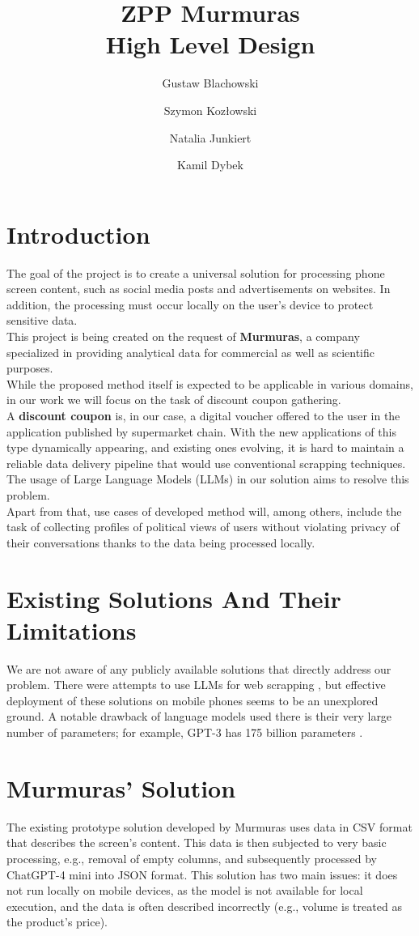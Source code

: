 \documentclass[12pt]{article}
\title{ZPP Murmuras\\ High Level Design}
\author{Gustaw Blachowski \and Szymon Kozłowski \and Natalia Junkiert \and Kamil Dybek}
\date{}
\begin{document}
\maketitle

\section*{Introduction}
The goal of the project is to create a universal solution for processing phone screen content, such as social media posts and advertisements on websites. In addition, the processing must occur locally on the user's device to protect sensitive data.\\
This project is being created on the request of \textbf{Murmuras}, a company specialized in providing analytical data for commercial as well as scientific purposes. \\
While the proposed method itself is expected to be applicable in various domains, in our work we will focus on the task of discount coupon gathering.\\
A \textbf{discount coupon} is, in our case, a digital voucher offered to the user in the application published by supermarket chain. With the new applications of this type dynamically appearing, and existing ones evolving, it is hard to maintain a reliable data delivery pipeline that would use conventional scrapping techniques. The usage of Large Language Models (LLMs) in our solution aims to resolve this problem. \\
Apart from that, use cases of developed method will, among others, include the task of collecting profiles of political views of users without violating privacy of their conversations thanks to the data being processed locally.

\section*{Existing Solutions And Their Limitations}
We are not aware of any publicly available solutions that directly address our problem. There were attempts to use LLMs for web scrapping \cite{scrapegraph-ai}\cite{llm-reader}, but effective deployment of these solutions on mobile phones seems to be an unexplored ground. A notable drawback of language models used there is their very large number of parameters; for example, GPT-3 has 175 billion parameters \cite{brown2020languagemodelsfewshotlearners}.

\section*{Murmuras' Solution}
The existing prototype solution developed by Murmuras uses data in CSV format that describes the screen's content. This data is then subjected to very basic processing, e.g., removal of empty columns, and subsequently processed by ChatGPT-4 mini into JSON format. This solution has two main issues: it does not run locally on mobile devices, as the model is not available for local execution, and the data is often described incorrectly (e.g., volume is treated as the product's price).
\end{document}
